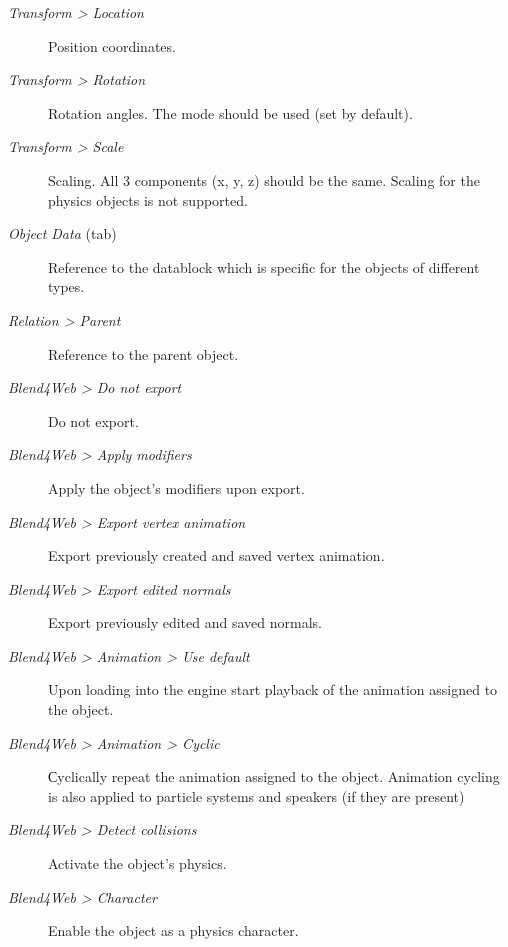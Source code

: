 \documentclass[a4paper,12pt,oneside]{sphinxmanual}
\begin{document}
\begin{description}
\item[{\emph{Transform \textgreater{} Location}}] \leavevmode
Position coordinates.

\item[{\emph{Transform \textgreater{} Rotation}}] \leavevmode
Rotation angles. The  mode should be used (set by default).

\item[{\emph{Transform \textgreater{} Scale}}] \leavevmode
Scaling. All 3 components (x, y, z) should be the same. Scaling for the physics objects is not supported.

\item[{\emph{Object Data} (tab)}] \leavevmode
Reference to the datablock which is specific for the objects of different types.

\item[{\emph{Relation \textgreater{} Parent}}] \leavevmode
Reference to the parent object.

\item[{\emph{Blend4Web \textgreater{} Do not export}}] \leavevmode
Do not export.

\item[{\emph{Blend4Web \textgreater{} Apply modifiers}}] \leavevmode
Apply the object's modifiers upon export.

\item[{\emph{Blend4Web \textgreater{} Export vertex animation}}] \leavevmode
Export previously created and saved vertex animation.

\item[{\emph{Blend4Web \textgreater{} Export edited normals}}] \leavevmode
Export previously edited and saved normals.

\item[{\emph{Blend4Web \textgreater{} Animation \textgreater{} Use default}}] \leavevmode
Upon loading into the engine start playback of the animation assigned to the object.

\item[{\emph{Blend4Web \textgreater{} Animation \textgreater{} Cyclic}}] \leavevmode
Сyclically repeat the animation assigned to the object. Animation cycling is also applied to particle systems and speakers (if they are present)

\item[{\emph{Blend4Web \textgreater{} Detect collisions}}] \leavevmode
Activate the object's physics.

\item[{\emph{Blend4Web \textgreater{} Character}}] \leavevmode
Enable the object as a physics character.


\end{description}
\end{document}

